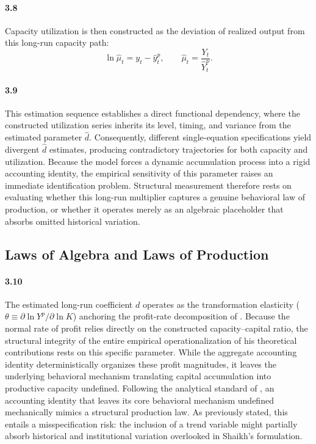 \paragraph{3.8}
Capacity utilization is then constructed as the deviation of realized output from this long-run capacity path:
\begin{equation}
\ln \hat{\mu}_t = y_t - \hat{y}^p_t,
\qquad
\hat{\mu}_t = \frac{Y_t}{\hat{Y}^p_t}.
\end{equation}

\paragraph{3.9}
This estimation sequence establishes a direct functional dependency, where the constructed utilization series inherits its level, timing, and variance from the estimated parameter $\hat{d}$. Consequently, different single-equation specifications yield divergent $\hat{d}$ estimates, producing contradictory trajectories for both capacity and utilization. Because the model forces a dynamic accumulation process into a rigid accounting identity, the empirical sensitivity of this parameter raises an immediate identification problem. Structural measurement therefore rests on evaluating whether this long-run multiplier captures a genuine behavioral law of production, or whether it operates merely as an algebraic placeholder that absorbs omitted historical variation.

\subsection{Laws of Algebra and Laws of Production}

\paragraph{3.10}
The estimated long-run coefficient $d$ operates as the transformation elasticity ($\theta \equiv \partial \ln Y^p / \partial \ln K$) anchoring the profit-rate decomposition of \citet{Shaikh2016}. Because the normal rate of profit relies directly on the constructed capacity--capital ratio, the structural integrity of the entire empirical operationalization of his theoretical contributions rests on this specific parameter. While the aggregate accounting identity deterministically organizes these profit magnitudes, it leaves the underlying behavioral mechanism translating capital accumulation into productive capacity undefined. Following the analytical standard of \citet{Shaikh1974}, an accounting identity that leaves its core behavioral mechanism undefined mechanically mimics a structural production law. As previously stated, this entails a misspecification risk: the inclusion of a trend variable might partially absorb historical and institutional variation overlooked in Shaikh's formulation.

